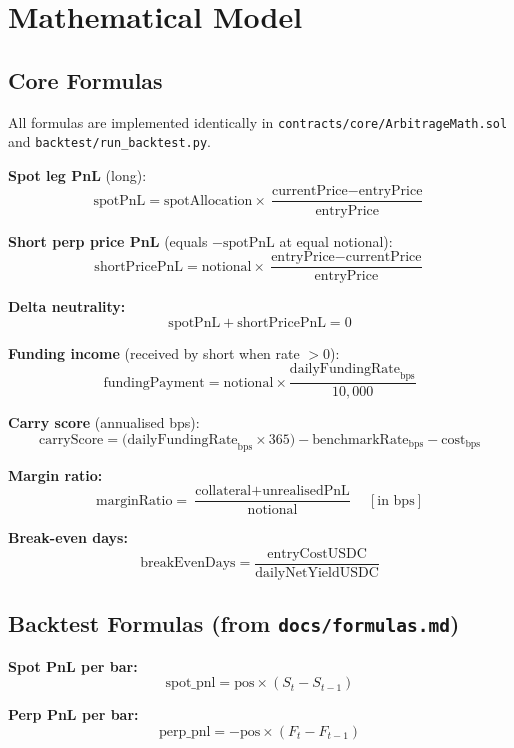 \documentclass[11pt,a4paper]{article}
\begin{document}
\section{Mathematical Model}

\subsection{Core Formulas}

All formulas are implemented identically in \texttt{contracts/core/ArbitrageMath.sol} and \texttt{backtest/run\_backtest.py}.

\textbf{Spot leg PnL} (long):
\[
    \text{spotPnL} = \text{spotAllocation} \times \frac{\text{currentPrice} - \text{entryPrice}}{\text{entryPrice}}
\]

\textbf{Short perp price PnL} (equals $-\text{spotPnL}$ at equal notional):
\[
    \text{shortPricePnL} = \text{notional} \times \frac{\text{entryPrice} - \text{currentPrice}}{\text{entryPrice}}
\]

\textbf{Delta neutrality:}
\[
    \text{spotPnL} + \text{shortPricePnL} = 0
\]

\textbf{Funding income} (received by short when rate $> 0$):
\[
    \text{fundingPayment} = \text{notional} \times \frac{\text{dailyFundingRate}_{\text{bps}}}{10{,}000}
\]

\textbf{Carry score} (annualised bps):
\[
    \text{carryScore} = \bigl(\text{dailyFundingRate}_{\text{bps}} \times 365\bigr)
                        - \text{benchmarkRate}_{\text{bps}}
                        - \text{cost}_{\text{bps}}
\]

\textbf{Margin ratio:}
\[
    \text{marginRatio} = \frac{\text{collateral} + \text{unrealisedPnL}}{\text{notional}} \quad [\text{in bps}]
\]

\textbf{Break-even days:}
\[
    \text{breakEvenDays} = \frac{\text{entryCostUSDC}}{\text{dailyNetYieldUSDC}}
\]

\subsection{Backtest Formulas (from \texttt{docs/formulas.md})}

\textbf{Spot PnL per bar:}
\[
    \text{spot\_pnl} = \text{pos} \times (S_t - S_{t-1})
\]

\textbf{Perp PnL per bar:}
\[
    \text{perp\_pnl} = -\text{pos} \times (F_t - F_{t-1})
\]
\end{document}
